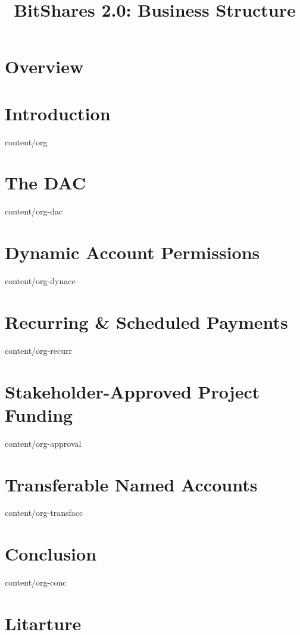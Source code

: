 \documentclass[conference,final,10pt,a4paper]{IEEEtran}
\title{BitShares 2.0: Business Structure}
\author{}
\begin{document}
\sloppy
\maketitle

\begin{abstract}
\end{abstract}

\section{Overview}
\section  { Introduction                         }  { content/org           } 
\section  { The DAC                              }  { content/org-dac       }
\section  { Dynamic Account Permissions          }  { content/org-dynacc    } 
\section  { Recurring \& Scheduled Payments      }  { content/org-recurr    } 
\section  { Stakeholder-Approved Project Funding }  { content/org-approval  } 
\section  { Transferable Named Accounts          }  { content/org-transfacc } 
\section  { Conclusion                           }  { content/org-conc      } 
\section* { Litarture                            } 
\end{document}
